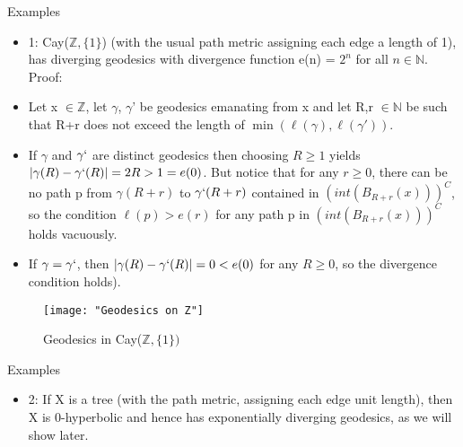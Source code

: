 \documentclass[11pt]{beamer}
\newcommand{\vs}{\vskip10pt}
\begin{document}
\begin{frame}{Examples}
	
\begin{itemize}
	
	\item 1: Cay($\mathbb{Z}, \{1\}$) (with the usual path metric assigning each edge a length of 1), has diverging geodesics with divergence function e(n) = $2^n$ for all $n \in \mathbb{N}$.
	\vs
	Proof: 
	
	\item Let x $\in \mathbb{Z}$, let $\gamma$, $\gamma$' be geodesics emanating from x and let R,r $\in \mathbb{N}$ be such that R+r does not exceed the length of $ \min(\ell(\gamma), \ell(\gamma'))$. 
	
	\item If $\gamma$ and $\gamma`$ are distinct geodesics then choosing $R \geq 1$ yields $\vert \gamma(R) - \gamma`(R) \vert = 2R > 1 = e(0)$. But notice that for any $r \geq 0$, there can be no path p from $\gamma(R+r)$ to $\gamma`(R+r)$ contained in $(int(B_{R+r}(x)))^C$, so the condition $\ell(p) > e(r)$ for any path p in $(int(B_{R+r}(x)))^C$ holds vacuously. 
	
	\item If $\gamma = \gamma`$, then $\vert \gamma(R) - \gamma`(R) \vert = 0 < e(0)$ for any $R \geq 0$, so the divergence condition holds).
	
	
\end{itemize}

	\end{frame}

		\begin{frame}
			
\begin{figure}
	\centering
	\texttt{[image: "Geodesics on Z"]}
	\caption{Geodesics in Cay($\mathbb{Z}, \{1\})$}
	\label{fig:geodesics-on-z}
\end{figure}
			
		\end{frame}
	
	\begin{frame}{Examples}
		
		\begin{itemize}
				\item 2: If X is a tree (with the path metric, assigning each edge unit length), then X is 0-hyperbolic and hence has exponentially diverging geodesics, as we will show later.
		\end{itemize}
		
	\end{frame}
	
\end{document}
